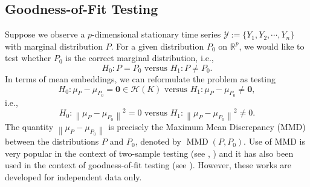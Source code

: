 \documentclass[11pt]{article}
\theoremstyle{plain}
\theoremstyle{definition}
\theoremstyle{remark}
\begin{document}
\subsection{Goodness-of-Fit Testing}\label{sec:method_GOF}
Suppose we observe a $p$-dimensional stationary time series $\mathcal{Y}:=\{Y_1,Y_2,\cdots,Y_n\}$ with marginal distribution $P$. For a given distribution $P_0$ on $\mathbb{R}^p$, we would like to test whether $P_0$ is the correct marginal distribution, i.e.,
$$H_0: P=P_0\text{   versus   }H_1:P\neq P_0.$$
In terms of mean embeddings, we can reformulate the problem as testing 
$$H_0:\mu_P-\mu_{P_0}=\mathbf{0}\in\mathcal{H}(K)\text{   versus  }H_1:\mu_P- \mu_{P_0}\neq \mathbf{0},$$
i.e.,
$$H_0:\left\|\mu_P-\mu_{P_0}\right\|^2=0\text{   versus  }H_1:\left\|\mu_P-\mu_{P_0}\right\|^2\neq 0.$$
The quantity $\left\|\mu_P-\mu_{P_0}\right\|$ is precisely the Maximum Mean Discrepancy (MMD) between the distributions $P$ and $P_0$, denoted by $\operatorname{MMD}(P,P_0).$  Use of MMD is very popular in the context of two-sample testing (see \cite{NIPS2006_e9fb2eda,gretton2009fast,JMLR:v13:gretton12a}, \cite{gaoshao23}) and it has also been used in the context of goodness-of-fit testing (see \cite{kellner2019one}). However, these works are developed for independent data only.\\
\end{document}
